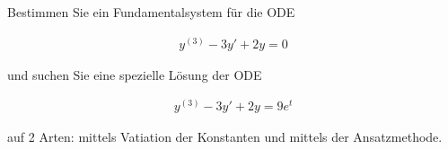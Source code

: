 \begin{exercise}
  Bestimmen Sie ein Fundamentalsystem für die ODE

  \begin{align*}
    y^{(3)} - 3y' + 2y = 0
  \end{align*}

  und suchen Sie eine spezielle Lösung der ODE

  \begin{align*}
    y^{(3)} - 3y' + 2y = 9 e^t
  \end{align*}

  auf 2 Arten:  mittels Vatiation der Konstanten und mittels der Ansatzmethode.
\end{exercise}

\begin{solution}

\end{solution}
